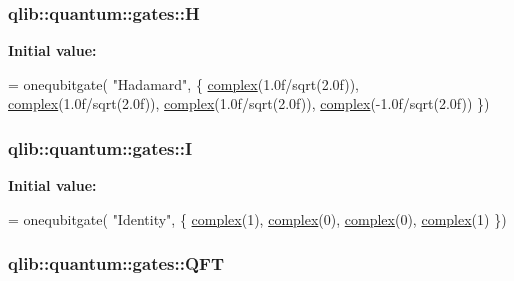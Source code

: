\subsubsection[{\texorpdfstring{H}{H}}]{ qlib\+::quantum\+::gates\+::H}\hypertarget{namespaceqlib_1_1quantum_1_1gates_a2519bc26f39ef5297d03a5fe7cdf3bc3}{}\label{namespaceqlib_1_1quantum_1_1gates_a2519bc26f39ef5297d03a5fe7cdf3bc3}
{\bfseries Initial value\+:}
\begin{DoxyCode}
= onequbitgate(
    \textcolor{stringliteral}{"Hadamard"}, 
    \{
        \hyperlink{classqlib_1_1math_1_1complex}{complex}(1.0f/sqrt(2.0f)), \hyperlink{classqlib_1_1math_1_1complex}{complex}(1.0f/sqrt(2.0f)),
        \hyperlink{classqlib_1_1math_1_1complex}{complex}(1.0f/sqrt(2.0f)), \hyperlink{classqlib_1_1math_1_1complex}{complex}(-1.0f/sqrt(2.0f))
    \})
\end{DoxyCode}
\subsubsection[{\texorpdfstring{I}{I}}]{ qlib\+::quantum\+::gates\+::I}\hypertarget{namespaceqlib_1_1quantum_1_1gates_a2a7dd0215add2c303251bb3a3ac596cc}{}\label{namespaceqlib_1_1quantum_1_1gates_a2a7dd0215add2c303251bb3a3ac596cc}
{\bfseries Initial value\+:}
\begin{DoxyCode}
= onequbitgate(
    \textcolor{stringliteral}{"Identity"}, 
    \{
        \hyperlink{classqlib_1_1math_1_1complex}{complex}(1), \hyperlink{classqlib_1_1math_1_1complex}{complex}(0),
        \hyperlink{classqlib_1_1math_1_1complex}{complex}(0), \hyperlink{classqlib_1_1math_1_1complex}{complex}(1)
    \})
\end{DoxyCode}
\subsubsection[{\texorpdfstring{Q\+FT}{QFT}}]{ qlib\+::quantum\+::gates\+::\+Q\+FT}\hypertarget{namespaceqlib_1_1quantum_1_1gates_aeeff3324a29947d6584bfaece3c28f71}{}\label{namespaceqlib_1_1quantum_1_1gates_aeeff3324a29947d6584bfaece3c28f71}
